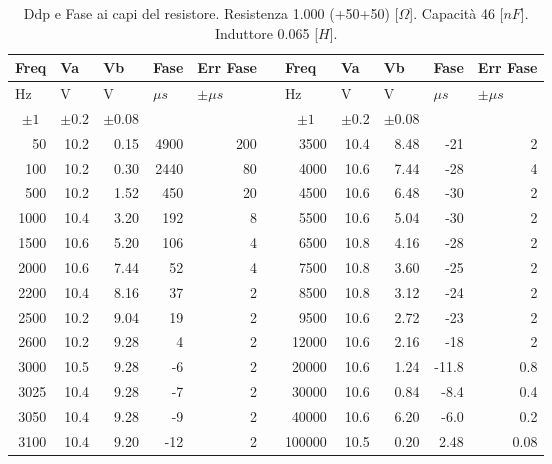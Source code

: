 \begin{table}[H]
\begin{center}
\begin{tabular}{|r|r|r|r|r|l|r|r|r|r|r|}
\hline
\multicolumn{1}{|l|}{Freq} & \multicolumn{1}{l|}{Va} & \multicolumn{1}{l|}{Vb} & \multicolumn{1}{l|}{Fase } & \multicolumn{1}{l|}{Err Fase} &  & \multicolumn{1}{l|}{Freq} & \multicolumn{1}{l|}{Va} & \multicolumn{1}{l|}{Vb} & \multicolumn{1}{l|}{Fase } & \multicolumn{1}{l|}{Err Fase} \\ \hline
\multicolumn{1}{|l|}{Hz} & \multicolumn{1}{l|}{V} & \multicolumn{1}{l|}{V} & \multicolumn{1}{l|}{$\mu s$} & \multicolumn{1}{l|}{$\pm \mu s$} &  & \multicolumn{1}{l|}{Hz} & \multicolumn{1}{l|}{V} & \multicolumn{1}{l|}{V} & \multicolumn{1}{l|}{$\mu s$} & \multicolumn{1}{l|}{$\pm \mu s$} \\ \hline
\multicolumn{1}{|c|}{$\pm 1$} & \multicolumn{1}{c|}{$\pm 0.2$} & \multicolumn{1}{c|}{$\pm 0.08$} & \multicolumn{1}{l|}{} & \multicolumn{1}{l|}{} &  & \multicolumn{1}{c|}{$\pm 1$} & \multicolumn{1}{c|}{$\pm 0.2$} & \multicolumn{1}{c|}{$\pm 0.08$} & \multicolumn{1}{l|}{} & \multicolumn{1}{l|}{} \\ \hline
50 & 10.2 & 0.15 & 4900 & 200 &  & 3500 & 10.4 & 8.48 & -21 & 2 \\ \hline
100 & 10.2 & 0.30 & 2440 & 80 &  & 4000 & 10.6 & 7.44 & -28 & 4 \\ \hline
500 & 10.2 & 1.52 & 450 & 20 &  & 4500 & 10.6 & 6.48 & -30 & 2 \\ \hline
1000 & 10.4 & 3.20 & 192 & 8 &  & 5500 & 10.6 & 5.04 & -30 & 2 \\ \hline
1500 & 10.6 & 5.20 & 106 & 4 &  & 6500 & 10.8 & 4.16 & -28 & 2 \\ \hline
2000 & 10.6 & 7.44 & 52 & 4 &  & 7500 & 10.8 & 3.60 & -25 & 2 \\ \hline
2200 & 10.4 & 8.16 & 37 & 2 &  & 8500 & 10.8 & 3.12 & -24 & 2 \\ \hline
2500 & 10.2 & 9.04 & 19 & 2 &  & 9500 & 10.6 & 2.72 & -23 & 2 \\ \hline
2600 & 10.2 & 9.28 & 4 & 2 &  & 12000 & 10.6 & 2.16 & -18 & 2 \\ \hline
3000 & 10.5 & 9.28 & -6 & 2 &  & 20000 & 10.6 & 1.24 & -11.8 & 0.8 \\ \hline
3025 & 10.4 & 9.28 & -7 & 2 &  & 30000 & 10.6 & 0.84 & -8.4 & 0.4 \\ \hline
3050 & 10.4 & 9.28 & -9 & 2 &  & 40000 & 10.6 & 6.20 & -6.0 & 0.2 \\ \hline
3100 & 10.4 & 9.20 & -12 & 2 &  & 100000 & 10.5 & 0.20 & 2.48 & 0.08 \\ \hline

\end{tabular}
\end{center}
\caption{
Ddp e Fase ai capi del resistore.
Resistenza 1.000 (+50+50)  [$\Omega$].
Capacità  46    [$nF$].
Induttore 0.065 [$H$].
}
\label{tab:C2_P2_res}
\end{table}